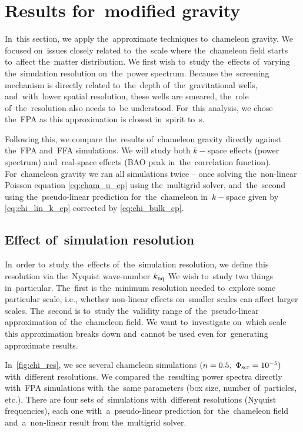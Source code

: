 \section{Results for~modified gravity}
\newcommand{\chileft}{\hspace*{-1cm}}
In~this section, we apply the~approximate techniques to~chameleon gravity. We focused on~issues closely related to~the~scale where the~chameleon field starts to~affect the~matter distribution. We first wish to~study the~effects of~varying the~simulation resolution on~the~power spectrum. Because the~screening mechanism is directly related to~the~depth of~the~gravitational wells, and~with~lower spatial resolution, these wells are smeared, the~role of~the~resolution also needs to~be understood. For~this analysis, we chose the~FPA as this approximation is closest in~spirit to~\nbodysim s.

Following this, we compare the~results of~chameleon gravity directly against the~FPA and~FFA simulations. %
We will study both $k-$space effects (power spectrum) and~real-space effects (BAO peak in~the~correlation function). For~chameleon gravity we ran all simulations twice -- once solving the~non-linear Poisson equation \eqref{eq:cham_u_cp} using the~multigrid solver, and~the~second using the~pseudo-linear prediction for~the~chameleon in~$k-$space given by \eqref{eq:chi_lin_k_cp} corrected by \eqref{eq:chi_bulk_cp}.

\subsection{Effect of~simulation resolution}
In~order to~study the~effects of~the~simulation resolution, we define this resolution via the~Nyquist wave-number $k_{\rm nq}$
We wish to~study two things in~particular. The~first is the~minimum resolution needed to~explore some particular scale, i.e., whether non-linear effects on~smaller scales can affect larger scales. The~second is to~study the~validity range of~the~pseudo-linear approximation of~the~chameleon field. We want to~investigate on~which scale this approximation breaks down and~cannot be used even for~generating approximate results.

In~\autoref{fig:chi_res}, we see several chameleon simulations $(n=0.5,\ \Phi_{\text{\scriptsize scr}}=10^{-5})$ with~different resolutions. We compared the~resulting power spectra directly with~FPA simulations with~the~same parameters (box size, number of~particles, etc.). There are four sets of~simulations with~different resolutions (Nyquist frequencies), each one with~a~pseudo-linear prediction for~the~chameleon field and~a~non-linear result from the~multigrid solver.

